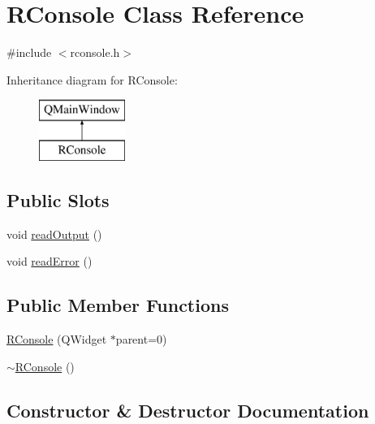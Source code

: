 \hypertarget{class_r_console}{}\section{R\+Console Class Reference}
\label{class_r_console}


{\ttfamily \#include $<$rconsole.\+h$>$}

Inheritance diagram for R\+Console\+:\begin{figure}[H]
\begin{center}
\leavevmode
\includegraphics[height=2.000000cm]{de/d5e/class_r_console}
\end{center}
\end{figure}
\subsection*{Public Slots}
\begin{DoxyCompactItemize}
\item 
void \mbox{\hyperlink{class_r_console_ad221772edf4f86270d4e0f43a300756c}{read\+Output}} ()
\item 
void \mbox{\hyperlink{class_r_console_a002edfbb44d2da8b971f01ccd0ff9994}{read\+Error}} ()
\end{DoxyCompactItemize}
\subsection*{Public Member Functions}
\begin{DoxyCompactItemize}
\item 
\mbox{\hyperlink{class_r_console_a4f1ca0bb0a9dd41665f4d00c4dfed1af}{R\+Console}} (Q\+Widget $\ast$parent=0)
\item 
\mbox{\hyperlink{class_r_console_af331091d28001820742078cd760560ff}{$\sim$\+R\+Console}} ()
\end{DoxyCompactItemize}


\subsection{Constructor \& Destructor Documentation}
\mbox{\label{class_r_console_a4f1ca0bb0a9dd41665f4d00c4dfed1af}} 
